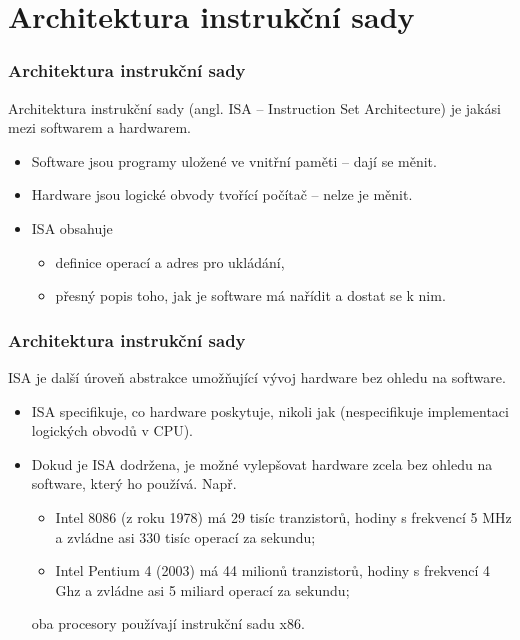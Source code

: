 \documentclass[aspectratio=169,11pt,svgnames]{beamer}
\begin{document}
\section{Architektura instrukční sady}

\begin{frame}
 \frametitle{Architektura instrukční sady}
 Architektura instrukční sady (angl. \alert{ISA} -- Instruction Set
 Architecture) je jakási  mezi softwarem a hardwarem.\pause\\
 \begin{itemize}[label=\textbullet]
  \item \alert{Software} jsou programy uložené ve vnitřní paměti -- dají se
   měnit.\pause
  \item \alert{Hardware} jsou logické obvody tvořící počítač -- nelze je
   měnit.\pause
  \item \alert{ISA} obsahuje
  \begin{itemize}[label=\textemdash]
   \item definice \alert{operací} a \alert{adres pro ukládání},\pause
   \item \alert{přesný popis} toho, jak je software má \alert{nařídit} a
    \alert{dostat se k nim}.
  \end{itemize}
 \end{itemize}
\end{frame}

\begin{frame}
 \frametitle{Architektura instrukční sady}
 ISA je další úroveň abstrakce umožňující vývoj hardware \alert{bez ohledu na
 software}.\pause
 \begin{itemize}[label=\textbullet]
  \item ISA specifikuje, \alert{co} hardware poskytuje, nikoli \alert{jak}
   (nespecifikuje implementaci logických obvodů v CPU).\pause
  \item Dokud je ISA dodržena, je možné vylepšovat hardware zcela bez ohledu na
   software, který ho používá. Např.
  \begin{itemize}[label=\textemdash]
   \item Intel 8086 (z roku 1978) má 29 tisíc tranzistorů, hodiny s frekvencí 5
    MHz a zvládne asi 330 tisíc operací za sekundu;\pause 
   \item Intel Pentium 4 (2003) má 44 milionů tranzistorů, hodiny s frekvencí 4
    Ghz a zvládne asi 5 miliard operací za sekundu;\pause
  \end{itemize}
  oba procesory používají instrukční sadu x86.
 \end{itemize}
\end{frame}
\end{document}
